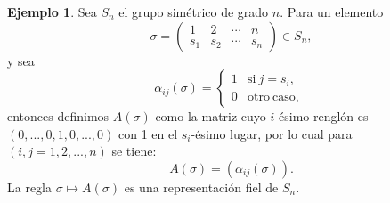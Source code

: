 \documentclass[12pt]{book}
\theoremstyle{definition}
\newtheorem{example}[theorem]{Ejemplo}
\newcounter{in}
\newcounter{ini}
\begin{document}
\begin{example}
  \label{Ej3}
  Sea $S_{n}$ el grupo simétrico de grado
  $n$. Para un elemento
  \begin{equation}
    \label{eq:1}
    \sigma =
    \begin{pmatrix}
      1 & 2 & \cdots  & n\\
      s_{1} & s_{2} & \cdots & s_{n}
    \end{pmatrix} 
    \in S_{n},
  \end{equation}
  y sea
  \begin{equation*}
    \alpha_{ij}\left(\sigma\right) = \left\{
      \begin{array}{ll}
        1      & \mathrm{si\ } j = s_{i}, \\
        0      & \mathrm{otro\ caso,\ } 
      \end{array}
    \right.
  \end{equation*}
  entonces definimos $A\left(\sigma\right)$ como la matriz cuyo
  $i$-ésimo renglón es $\left(0,...,0,1,0,...,0\right)$ con 1 en el
  $s_{i}$-ésimo lugar, por lo cual para $\left(i,j=1,2,...,n\right)$
  se tiene:
  \begin{equation*}
    A\left(\sigma\right) = \left(\alpha_{ij}\left(\sigma\right)\right).
  \end{equation*}
  La regla $\sigma \mapsto A\left(\sigma\right)$ es una representación
  fiel de $S_{n}$.
\end{example}
\end{document}
